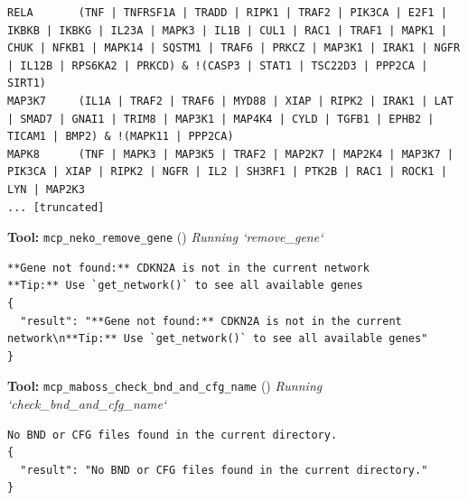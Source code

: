 \documentclass[11pt,a4paper]{article}
\begin{document}
\begin{toolokbox}
\begin{lstlisting}
RELA       (TNF | TNFRSF1A | TRADD | RIPK1 | TRAF2 | PIK3CA | E2F1 | IKBKB | IKBKG | IL23A | MAPK3 | IL1B | CUL1 | RAC1 | TRAF1 | MAPK1 | CHUK | NFKB1 | MAPK14 | SQSTM1 | TRAF6 | PRKCZ | MAP3K1 | IRAK1 | NGFR | IL12B | RPS6KA2 | PRKCD) & !(CASP3 | STAT1 | TSC22D3 | PPP2CA | SIRT1)
MAP3K7     (IL1A | TRAF2 | TRAF6 | MYD88 | XIAP | RIPK2 | IRAK1 | LAT | SMAD7 | GNAI1 | TRIM8 | MAP3K1 | MAP4K4 | CYLD | TGFB1 | EPHB2 | TICAM1 | BMP2) & !(MAPK11 | PPP2CA)
MAPK8      (TNF | MAPK3 | MAP3K5 | TRAF2 | MAP2K7 | MAP2K4 | MAP3K7 | PIK3CA | XIAP | RIPK2 | NGFR | IL2 | SH3RF1 | PTK2B | RAC1 | ROCK1 | LYN | MAP2K3 
... [truncated]
\end{lstlisting}
\end{toolokbox}
\begin{toolokbox}
\textbf{Tool:} \texttt{mcp\_neko\_remove\_gene} (\checkmark)
\textit{Running `remove\_gene`}
\begin{lstlisting}
**Gene not found:** CDKN2A is not in the current network
**Tip:** Use `get_network()` to see all available genes
{
  "result": "**Gene not found:** CDKN2A is not in the current network\n**Tip:** Use `get_network()` to see all available genes"
}
\end{lstlisting}
\end{toolokbox}
\begin{toolokbox}
\textbf{Tool:} \texttt{mcp\_maboss\_check\_bnd\_and\_cfg\_name} (\checkmark)
\textit{Running `check\_bnd\_and\_cfg\_name`}
\begin{lstlisting}
No BND or CFG files found in the current directory.
{
  "result": "No BND or CFG files found in the current directory."
}
\end{lstlisting}
\end{toolokbox}
\end{document}
